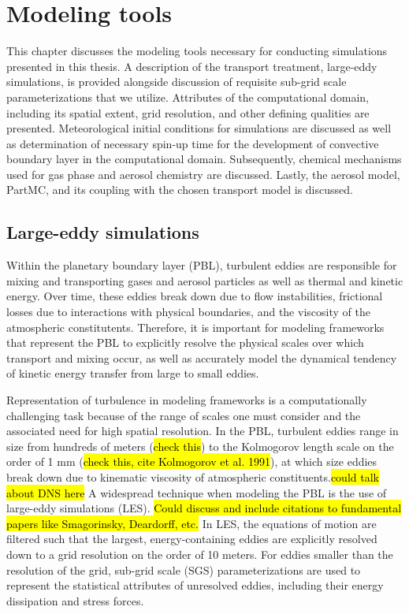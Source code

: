 \chapter{Modeling tools}
This chapter discusses the modeling tools necessary for conducting simulations presented in this thesis. A description of the transport treatment, large-eddy simulations, is provided alongside discussion of requisite sub-grid scale parameterizations that we utilize. Attributes of the computational domain, including its spatial extent, grid resolution, and other defining qualities are presented. Meteorological initial conditions for simulations are discussed as well as determination of necessary spin-up time for the development of convective boundary layer in the computational domain. Subsequently, chemical mechanisms used for gas phase and aerosol chemistry are discussed. Lastly, the aerosol model, PartMC, and its coupling with the chosen transport model is discussed. 

\section{Large-eddy simulations}
Within the planetary boundary layer (PBL), turbulent eddies are responsible for mixing and transporting gases and aerosol particles as well as thermal and kinetic energy. Over time, these eddies break down due to flow instabilities, frictional losses due to interactions with physical boundaries, and the viscosity of the atmospheric constitutents. Therefore, it is important for modeling frameworks that represent the PBL to explicitly resolve the physical scales over which transport and mixing occur, as well as accurately model the dynamical tendency of kinetic energy transfer from large to small eddies. 

Representation of turbulence in modeling frameworks is a computationally challenging task because of the range of scales one must consider and the associated need for high spatial resolution. In the PBL, turbulent eddies range in size from hundreds of meters (\hl{check this}) to the Kolmogorov length scale on the order of 1 mm (\hl{check this, cite Kolmogorov et al. 1991}), at which size eddies break down due to kinematic viscosity of atmospheric constituents.\hl{could talk about DNS here} A widespread technique when modeling the PBL is the use of large-eddy simulations (LES). \hl{Could discuss and include citations to fundamental papers like Smagorinsky, Deardorff, etc.} In LES, the equations of motion are filtered such that the largest, energy-containing eddies are explicitly resolved down to a grid resolution on the order of 10 meters. For eddies smaller than the resolution of the grid, sub-grid scale (SGS) parameterizations are used to represent the statistical attributes of unresolved eddies, including their energy dissipation and stress forces.  

